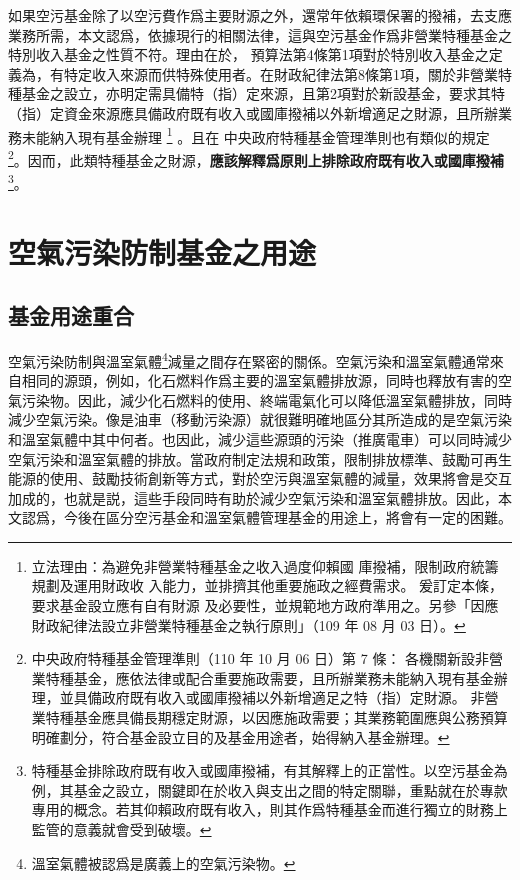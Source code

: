 \documentclass[12pt,a4paper]{article}
\begin{document}
如果空污基金除了以空污費作爲主要財源之外，還常年依賴環保署的撥補，去支應業務所需，本文認爲，依據現行的相關法律，這與空污基金作爲非營業特種基金之特別收入基金之性質不符。理由在於，
預算法第4條第1項對於特別收入基金之定義為，有特定收入來源而供特殊使用者。在財政紀律法第8條第1項，關於非營業特種基金之設立，亦明定需具備特（指）定來源，且第2項對於新設基金，要求其特（指）定資金來源應具備政府既有收入或國庫撥補以外新增適足之財源，且所辦業務未能納入現有基金辦理
\footnote{立法理由：為避免非營業特種基金之收入過度仰賴國
庫撥補，限制政府統籌規劃及運用財政收
入能力，並排擠其他重要施政之經費需求。
爰訂定本條，要求基金設立應有自有財源
及必要性，並規範地方政府準用之。另參「因應財政紀律法設立非營業特種基金之執行原則」（109 年 08 月 03 日）。}
。且在	中央政府特種基金管理準則也有類似的規定
\footnote{	中央政府特種基金管理準則（110 年 10 月 06 日）第 7 條：
各機關新設非營業特種基金，應依法律或配合重要施政需要，且所辦業務未能納入現有基金辦理，並具備政府既有收入或國庫撥補以外新增適足之特（指）定財源。
非營業特種基金應具備長期穩定財源，以因應施政需要；其業務範圍應與公務預算明確劃分，符合基金設立目的及基金用途者，始得納入基金辦理。}。因而，此類特種基金之財源，\textbf{應該解釋爲原則上排除政府既有收入或國庫撥補}\footnote{特種基金排除政府既有收入或國庫撥補，有其解釋上的正當性。以空污基金為例，其基金之設立，關鍵即在於收入與支出之間的特定關聯，重點就在於專款專用的概念。若其仰賴政府既有收入，則其作爲特種基金而進行獨立的財務上監管的意義就會受到破壞。
}。

\section{空氣污染防制基金之用途}



\subsection{基金用途重合}

空氣污染防制與溫室氣體\footnote{溫室氣體被認爲是廣義上的空氣污染物。}減量之間存在緊密的關係。空氣污染和溫室氣體通常來自相同的源頭，例如，化石燃料作爲主要的溫室氣體排放源，同時也釋放有害的空氣污染物。因此，減少化石燃料的使用、終端電氣化可以降低溫室氣體排放，同時減少空氣污染。像是油車（移動污染源）就很難明確地區分其所造成的是空氣污染和溫室氣體中其中何者。也因此，減少這些源頭的污染（推廣電車）可以同時減少空氣污染和溫室氣體的排放。當政府制定法規和政策，限制排放標準、鼓勵可再生能源的使用、鼓勵技術創新等方式，對於空污與溫室氣體的減量，效果將會是交互加成的，也就是説，這些手段同時有助於減少空氣污染和溫室氣體排放。因此，本文認爲，今後在區分空污基金和溫室氣體管理基金的用途上，將會有一定的困難。
\end{document}
